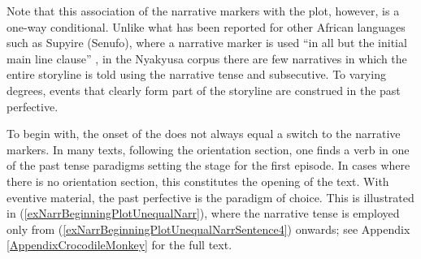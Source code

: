 Note that this association of the narrative markers with the plot, however, is a one-way conditional. Unlike what has been reported for other African languages such as Supyire (Senufo), where a narrative marker is used ``in all but the initial main line clause'' \citep[34]{CarlsonR1994}, in the Nyakyusa corpus there are few narratives in which the entire storyline is told using the narrative tense and subsecutive. To varying degrees, events that clearly form part of the storyline are construed in the past perfective.

To begin with, the onset of the  does not always equal a switch to the narrative markers. In many texts, following the orientation section, one finds a verb in one of the past tense paradigms setting the stage for the first episode. In cases where there is no orientation section, this constitutes the opening of the text. With eventive material, the past perfective is the paradigm of choice. This is illustrated in (\ref{exNarrBeginningPlotUnequalNarr}), where the narrative tense is employed only from (\ref{exNarrBeginningPlotUnequalNarrSentence4}) onwards; see Appendix \ref{AppendixCrocodileMonkey} for the full text.

